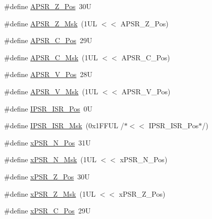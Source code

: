 \begin{DoxyCompactItemize}
\item 
\#define \mbox{\hyperlink{group___c_m_s_i_s___c_o_r_e_ga3661286d108b1aca308d7445685eae3a}{A\+P\+S\+R\+\_\+\+Z\+\_\+\+Pos}}~30U
\item 
\#define \mbox{\hyperlink{group___c_m_s_i_s___c_o_r_e_ga1deb4d1aa72bb83d1f79329406f15711}{A\+P\+S\+R\+\_\+\+Z\+\_\+\+Msk}}~(1\+U\+L $<$$<$ A\+P\+S\+R\+\_\+\+Z\+\_\+\+Pos)
\item 
\#define \mbox{\hyperlink{group___c_m_s_i_s___c_o_r_e_ga6cf72aa6f09a168f9e5beda1a4a887b9}{A\+P\+S\+R\+\_\+\+C\+\_\+\+Pos}}~29U
\item 
\#define \mbox{\hyperlink{group___c_m_s_i_s___c_o_r_e_ga6d47803fbad455bc10bd1ce59f2f335d}{A\+P\+S\+R\+\_\+\+C\+\_\+\+Msk}}~(1\+U\+L $<$$<$ A\+P\+S\+R\+\_\+\+C\+\_\+\+Pos)
\item 
\#define \mbox{\hyperlink{group___c_m_s_i_s___c_o_r_e_gac62830f67679ccd11658c4172c3e6ea7}{A\+P\+S\+R\+\_\+\+V\+\_\+\+Pos}}~28U
\item 
\#define \mbox{\hyperlink{group___c_m_s_i_s___c_o_r_e_ga33305d6701356bff6890b315fe8b5489}{A\+P\+S\+R\+\_\+\+V\+\_\+\+Msk}}~(1\+U\+L $<$$<$ A\+P\+S\+R\+\_\+\+V\+\_\+\+Pos)
\item 
\#define \mbox{\hyperlink{group___c_m_s_i_s___c_o_r_e_ga0e34027584d02c43811ae908a5ca9adf}{I\+P\+S\+R\+\_\+\+I\+S\+R\+\_\+\+Pos}}~0U
\item 
\#define \mbox{\hyperlink{group___c_m_s_i_s___c_o_r_e_gaf013a4579a64d1f21f56ea9f1b33ab56}{I\+P\+S\+R\+\_\+\+I\+S\+R\+\_\+\+Msk}}~(0x1\+F\+F\+U\+L /$\ast$$<$$<$ I\+P\+S\+R\+\_\+\+I\+S\+R\+\_\+\+Pos$\ast$/)
\item 
\#define \mbox{\hyperlink{group___c_m_s_i_s___c_o_r_e_ga031eb1b8ebcdb3d602d0b9f2ec82a7ae}{x\+P\+S\+R\+\_\+\+N\+\_\+\+Pos}}~31U
\item 
\#define \mbox{\hyperlink{group___c_m_s_i_s___c_o_r_e_gaf600f4ff41b62cf2f3b0a59b6d2e93d6}{x\+P\+S\+R\+\_\+\+N\+\_\+\+Msk}}~(1\+U\+L $<$$<$ x\+P\+S\+R\+\_\+\+N\+\_\+\+Pos)
\item 
\#define \mbox{\hyperlink{group___c_m_s_i_s___c_o_r_e_ga5869dd608eea73c80f0567d781d2230b}{x\+P\+S\+R\+\_\+\+Z\+\_\+\+Pos}}~30U
\item 
\#define \mbox{\hyperlink{group___c_m_s_i_s___c_o_r_e_ga907599209fba99f579778e662021c4f2}{x\+P\+S\+R\+\_\+\+Z\+\_\+\+Msk}}~(1\+U\+L $<$$<$ x\+P\+S\+R\+\_\+\+Z\+\_\+\+Pos)
\item 
\#define \mbox{\hyperlink{group___c_m_s_i_s___c_o_r_e_ga14adb79b91f6634b351a1b57394e2db6}{x\+P\+S\+R\+\_\+\+C\+\_\+\+Pos}}~29U
\item 
$$
\end{DoxyCompactItemize}
